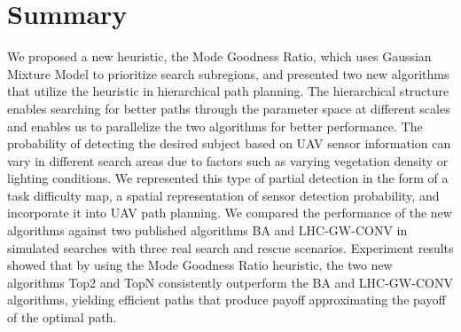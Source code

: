 \section{Summary} 
\label{sec:Summary}

We proposed a new heuristic, the Mode Goodness Ratio, which uses Gaussian Mixture Model to prioritize search subregions, and presented two new algorithms that utilize the heuristic in hierarchical path planning. The hierarchical structure enables searching for better paths through the parameter space at different scales and enables us to parallelize the two algorithms for better performance. The probability of detecting the desired subject based on UAV sensor information can vary in different search areas due to factors such as varying vegetation density or lighting conditions. We represented this type of partial detection in the form of a task difficulty map, a spatial representation of sensor detection probability, and incorporate it into UAV path planning. We compared the performance of the new algorithms against two published algorithms BA and LHC-GW-CONV in simulated searches with three real search and rescue scenarios. Experiment results showed that by using the Mode Goodness Ratio heuristic, the two new algorithms Top2 and TopN consistently outperform the BA and LHC-GW-CONV algorithms, yielding efficient paths that produce payoff approximating the payoff of the optimal path.  
